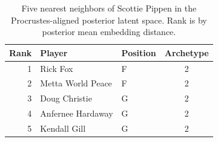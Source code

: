 \begin{table}[htbp]
  \centering\small
  \begin{tabular}{rllc}
    \toprule
    Rank & Player & Position & Archetype \\
    \midrule
    1 & Rick Fox & F & 2 \\
    2 & Metta World Peace & F & 2 \\
    3 & Doug Christie & G & 2 \\
    4 & Anfernee Hardaway & G & 2 \\
    5 & Kendall Gill & G & 2 \\
    \bottomrule
  \end{tabular}
  \caption{Five nearest neighbors of Scottie Pippen in the Procrustes-aligned posterior latent space. Rank is by posterior mean embedding distance.}
  \label{tab:Scottie_Pippen_neighbors}
\end{table}

